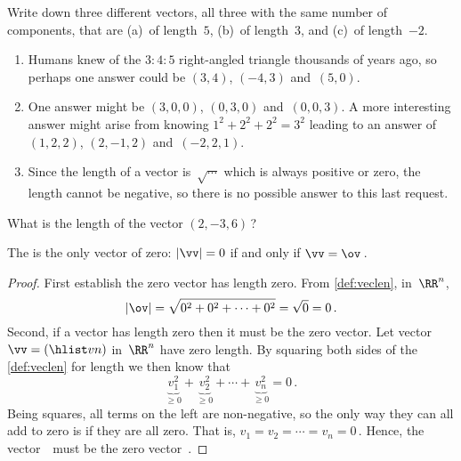 \begin{example} \label{eg:}
Write down three different vectors, all three with the same number of components, that are (a)~of length~\(5\), (b)~of length~\(3\), and (c)~of length~\(-2\).
\begin{solution} 
\begin{enumerate}
\item Humans knew of the \(3:4:5\) right-angled triangle thousands of years ago, so perhaps one answer could be \((3,4)\), \((-4,3)\) and~\((5,0)\).
\item One answer might be \((3,0,0)\), \((0,3,0)\) and~\((0,0,3)\). 
A more interesting answer might arise from knowing \(1^2+2^2+2^2=3^2\) leading to an answer of \((1,2,2)\), \((2,-1,2)\) and~\((-2,2,1)\).
\item Since the length of a vector is~\(\sqrt{\cdots}\) which is always positive or zero, the length cannot be negative, so there is no possible answer to this last request.
\end{enumerate}
 
\end{solution}
\end{example}




\begin{activity}
What is the length of the vector \((2,-3,6)\)\,?
\end{activity}




\begin{theorem} \label{thm:veclen0}
The  is the only vector of  zero:
 \(|\vv|=0\) if and only if \(\vv=\ov\)\,.
\end{theorem}

\begin{proof} 
First establish the zero vector has length zero.
From \autoref{def:veclen}, in~\(\RR^n\),
\begin{equation*}
|\ov|=\sqrt{0^2+0^2+\cdots+0^2}=\sqrt{0}=0\,.
\end{equation*}
Second, if a vector has length zero then it must be the zero vector.
Let vector \(\vv=(\hlist vn)\) in~\(\RR^n\) have zero length.
By squaring both sides of the \autoref{def:veclen} for length we then know that
\begin{equation*}
\underbrace{v_1^2}_{\geq0}+\underbrace{v_2^2}_{\geq0}
+\cdots+\underbrace{v_n^2}_{\geq0}=0\,.
\end{equation*}
Being squares, all terms on the left are non-negative, so the only way they can all add to zero is if they are all zero.
That is, \(v_1=v_2=\cdots=v_n=0\)\,.
Hence, the vector~\vv\ must be the zero vector~\ov.
\end{proof}






